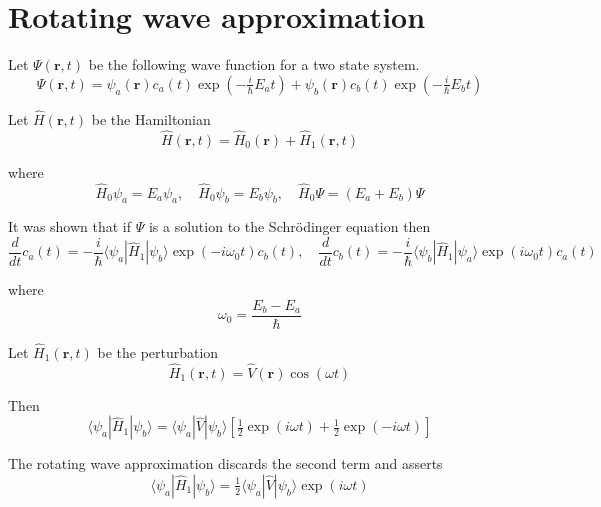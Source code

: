 

\section*{Rotating wave approximation}

Let $\Psi(\mathbf r,t)$ be the following wave function for a two state system.
\begin{equation*}
\Psi(\mathbf r,t)=\psi_a(\mathbf r)c_a(t)\exp(-\tfrac{i}{\hbar}E_at)+
\psi_b(\mathbf r)c_b(t)\exp(-\tfrac{i}{\hbar}E_bt)
\end{equation*}

Let $\hat H(\mathbf r,t)$ be the Hamiltonian
\begin{equation*}
\hat H(\mathbf r,t)=\hat H_0(\mathbf r)+\hat H_1(\mathbf r,t)
\end{equation*}

where
\begin{equation*}
\hat H_0\psi_a=E_a\psi_a,\quad\hat H_0\psi_b=E_b\psi_b,\quad
\hat H_0\Psi=(E_a+E_b)\Psi
\end{equation*}

It was shown that if $\Psi$ is a solution to the Schr\"odinger equation then
\begin{equation*}
\frac{d}{dt}c_a(t)=-\frac{i}{\hbar}\langle\psi_a|\hat H_1|\psi_b\rangle\exp(-i\omega_0t)c_b(t),\quad
\frac{d}{dt}c_b(t)=-\frac{i}{\hbar}\langle\psi_b|\hat H_1|\psi_a\rangle\exp(i\omega_0t)c_a(t)
\tag{1}
\end{equation*}

where
\begin{equation*}
\omega_0=\frac{E_b-E_a}{\hbar}
\end{equation*}

Let $\hat H_1(\mathbf r,t)$ be the perturbation
\begin{equation*}
\hat H_1(\mathbf r,t)=\hat V(\mathbf r)\cos(\omega t)
\end{equation*}

Then
\begin{equation*}
\langle\psi_a|\hat H_1|\psi_b\rangle
=\langle\psi_a|\hat V|\psi_b\rangle
\left[\tfrac{1}{2}\exp(i\omega t)+\tfrac{1}{2}\exp(-i\omega t)\right]
\end{equation*}

The rotating wave approximation discards the second term and asserts
\begin{equation*}
\langle\psi_a|\hat H_1|\psi_b\rangle=\tfrac{1}{2}\langle\psi_a|\hat V|\psi_b\rangle\exp(i\omega t)
\tag{2}
\end{equation*}

